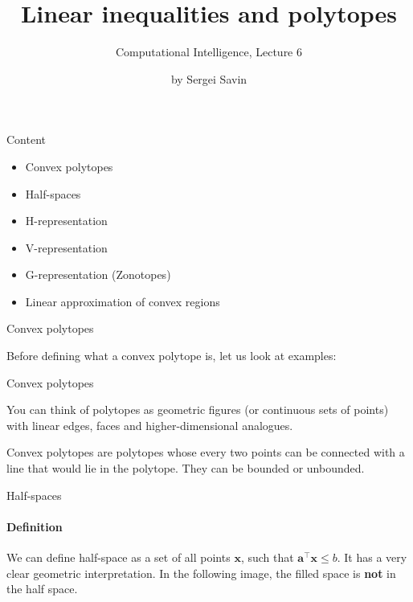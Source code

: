 \documentclass{beamer}
\title{Linear inequalities and polytopes}
\subtitle{Computational Intelligence, Lecture 6}
\author{by Sergei Savin}
\date{\mydate}
\begin{document}
\maketitle


\begin{frame}{Content}

\begin{itemize}
\item Convex polytopes
\item Half-spaces
\item H-representation
\item V-representation
\item G-representation (Zonotopes)
\item Linear approximation of convex regions
\end{itemize}

\end{frame}



\begin{frame}{Convex polytopes}
\begin{flushleft}

Before defining what a convex polytope is, let us look at examples:


 
\end{flushleft}
\end{frame}


\begin{frame}{Convex polytopes}
\begin{flushleft}

You can think of polytopes as geometric figures (or continuous sets of points) with linear edges, faces and higher-dimensional analogues.

\bigskip

\begin{definition}
 Convex polytopes are polytopes whose every two points can be connected with a line that would lie in the polytope. They can be bounded or unbounded.
\end{definition}
 
\end{flushleft}
\end{frame}


\begin{frame}{Half-spaces}
\framesubtitle{Definition}
\begin{flushleft}

We can define half-space as a set of all points $\mathbf{x}$, such that $\mathbf{a}^\top \mathbf{x} \leq b$. It has a very clear geometric interpretation. In the following image, the filled space is \textbf{not} in the half space.


 
\end{flushleft}
\end{frame}
\end{document}

